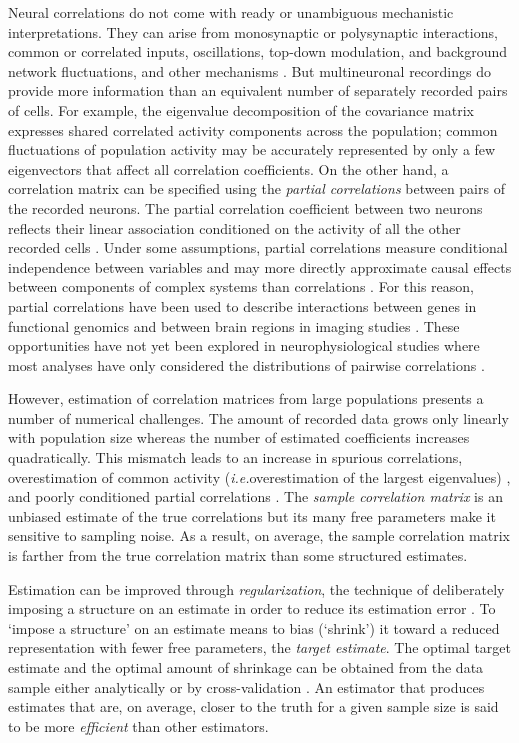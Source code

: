 Neural correlations do not come with ready or unambiguous mechanistic interpretations. They can arise from monosynaptic or polysynaptic interactions, common or correlated inputs, oscillations, top-down modulation, and background network fluctuations, and other mechanisms \cite{Perkel:1967, Moore:1970, Shadlen:1998, Salinas:2001, Ostojic:2009, Rosenbaum:2011}. But multineuronal recordings do provide more information than an equivalent number of separately recorded pairs of cells. For example, the eigenvalue decomposition of the covariance matrix expresses shared correlated activity components across the population; common fluctuations of population activity may be accurately represented by only a few eigenvectors that affect all correlation coefficients. On the other hand, a correlation matrix can be specified using the \emph{partial correlations} between pairs of the recorded neurons. The partial correlation coefficient between two neurons reflects their linear association conditioned on the activity of all the other recorded cells \cite{Whittaker:1990}.  Under some assumptions, partial correlations measure conditional independence between variables and may more directly approximate causal effects between components of complex systems than correlations \cite{Whittaker:1990}. For this reason, partial correlations have been used to describe interactions between genes in functional genomics \cite{Schafer:2005, Peng:2009} and between brain regions in imaging studies \cite{Varoquaux:2012, Ryali:2012}. These opportunities have not yet been explored in neurophysiological studies where most analyses have only considered the distributions of pairwise correlations \cite{Zohary:1994, Bair:2001, Smith:2008, Ecker:2010}.

However, estimation of correlation matrices from large populations presents a number of numerical challenges. The amount of recorded data grows only linearly with population size whereas the number of estimated coefficients increases quadratically. This mismatch leads to an increase in spurious correlations, overestimation of common activity (\emph{i.e.}\;overestimation of the largest eigenvalues) \cite{Ledoit:2004}, and poorly conditioned partial correlations \cite{Schafer:2005}. The \emph{sample correlation matrix} is an unbiased estimate of the true correlations but its many free parameters make it sensitive to sampling noise. As a result, on average, the sample correlation matrix is farther from the true correlation matrix than some structured estimates.

Estimation can be improved through \emph{regularization},  the technique of deliberately imposing a structure on an estimate in order to reduce its estimation error \cite{Schafer:2005, Bickel:2006}. To `impose a structure' on an estimate means to bias (`shrink') it toward a reduced representation  with fewer free parameters, the \emph{target estimate}.   The optimal target estimate and the optimal amount of shrinkage can be obtained from the data sample either analytically \cite{Ledoit:2003, Ledoit:2004, Schafer:2005}  or by cross-validation \cite{Friedman:1989}. An estimator that produces estimates that are, on average, closer to the truth for a given sample size is said to be more \emph{efficient} than other estimators.

